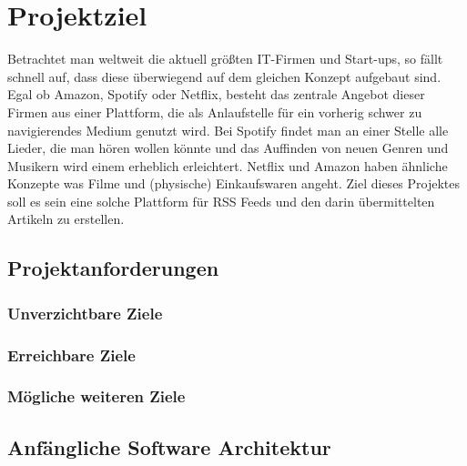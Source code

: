 
\chapter{Projektziel}

Betrachtet man weltweit die aktuell größten IT-Firmen und Start-ups, so fällt schnell auf, dass diese überwiegend auf dem gleichen Konzept aufgebaut sind.
Egal ob Amazon, Spotify oder Netflix, besteht das zentrale Angebot dieser Firmen aus einer Plattform, die als Anlaufstelle für ein vorherig schwer zu navigierendes Medium genutzt wird.
Bei Spotify findet man an einer Stelle alle Lieder, die man hören wollen könnte und das Auffinden von neuen Genren und Musikern wird einem erheblich erleichtert.
Netflix und Amazon haben ähnliche Konzepte was Filme und (physische) Einkaufswaren angeht.
Ziel dieses Projektes soll es sein eine solche Plattform für RSS Feeds und den darin übermittelten Artikeln zu erstellen.

\section{Projektanforderungen}
\subsection{Unverzichtbare Ziele}

\subsection{Erreichbare Ziele}

\subsection{Mögliche weiteren Ziele}

\section{Anfängliche Software Architektur}
